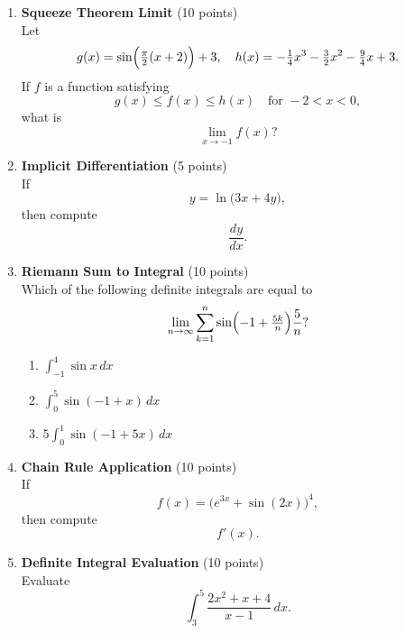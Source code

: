 \begin{enumerate}
  \item \textbf{Squeeze Theorem Limit} (10 points)\\
  Let
  \[
    g(x) = \sin\Bigl(\tfrac{\pi}{2}(x+2)\Bigr) + 3,\quad
    h(x) = -\tfrac{1}{4}x^3 - \tfrac{3}{2}x^2 - \tfrac{9}{4}x + 3.
  \]
  If $f$ is a function satisfying
  \[
    g(x) \le f(x) \le h(x)
    \quad\text{for } -2 < x < 0,
  \]
  what is
  \[
    \lim_{x \to -1} f(x)?
  \]
  \begin{subanswer}
  \end{subanswer}

  \item \textbf{Implicit Differentiation} (5 points)\\
  If
  \[
    y = \ln\bigl(3x + 4y\bigr),
  \]
  then compute
  \[
    \frac{dy}{dx}.
  \]
  \begin{subanswer}
  \end{subanswer}

  \item \textbf{Riemann Sum to Integral} (10 points)\\
  Which of the following definite integrals are equal to
  \[
    \lim_{n \to \infty} \sum_{k=1}^n \sin\Bigl(-1 + \tfrac{5k}{n}\Bigr) \frac{5}{n}?
  \]
  \begin{enumerate}[label=(\Roman*)]
    \item $\displaystyle \int_{-1}^{4} \sin x \,dx$
    \item $\displaystyle \int_{0}^{5} \sin(-1+x) \,dx$
    \item $\displaystyle 5 \int_{0}^{1} \sin(-1 + 5x) \,dx$
  \end{enumerate}
  \begin{subanswer}
  \end{subanswer}

  \item \textbf{Chain Rule Application} (10 points)\\
  If
  \[
    f(x) = \bigl(e^{3x} + \sin(2x)\bigr)^4,
  \]
  then compute
  \[
    f'(x).
  \]
  \begin{subanswer}
  \end{subanswer}

  \item \textbf{Definite Integral Evaluation} (10 points)\\
  Evaluate
  \[
    \int_{3}^{5} \frac{2x^2 + x + 4}{x - 1} \,dx.
  \]
  \begin{subanswer}
  \end{subanswer}


\end{enumerate}
